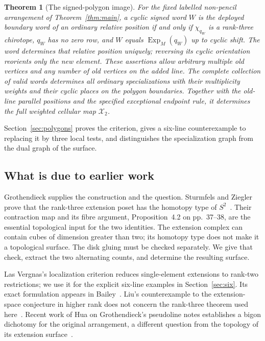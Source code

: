 \documentclass[11pt]{article}
\newtheorem{theorem}{Theorem}[section]
\theoremstyle{definition}\newtheorem{definition}[theorem]{Definition}
\begin{document}
\begin{theorem}[The signed-polygon image]\label{thm:polygon-image}
For the fixed labelled non-pencil arrangement of
Theorem~\ref{thm:main}, a cyclic signed word $W$ is the deployed
boundary word of an ordinary relative position if and only if
$\chi_{q_W}$ is a rank-three chirotope, $q_W$ has no zero row,
and $W$ equals $\operatorname{Exp}_M(q_W)$ up to cyclic shift.
The word determines that relative position uniquely; reversing its
cyclic orientation reorients only the new element. These assertions
allow arbitrary multiple old vertices and any number of old vertices
on the added line.
The complete collection of valid words determines all ordinary
specializations with their multiplicity weights and their cyclic
places on the polygon boundaries. Together with the old-line
parallel positions and the specified exceptional endpoint rule, it
determines the full weighted cellular map $\mathcal X_2$.
\end{theorem}
Section~\ref{sec:polygons} proves the criterion, gives a six-line
counterexample to replacing it by three local tests, and distinguishes
the specialization graph from the dual graph of the surface.

\subsection*{What is due to earlier work}
Grothendieck supplies the construction and the question. Sturmfels and
Ziegler prove that the rank-three extension poset has the homotopy type
of $S^2$~\cite[Theorem~1.2, p.~25; Corollary~4.5, p.~40]{SZ1993}.
Their contraction map and its fibre argument, Proposition~4.2 on
pp.~37--38, are the essential topological input for the two identities.
The extension complex can contain cubes of dimension greater than two;
its homotopy type does not make it a topological surface.
The disk gluing must be checked separately. We give that check, extract
the two alternating counts, and determine the resulting surface.

Las Vergnas's localization criterion reduces single-element extensions
to rank-two restrictions; we use it for the explicit six-line examples
in Section~\ref{sec:six}. Its exact formulation appears in
Bailey~\cite[Theorem~4.1, pp.~33--34]{Bailey1997}.
Liu's counterexample to the extension-space conjecture in higher rank
does not concern the rank-three theorem used here~\cite{Liu}.
Recent work of Hua on Grothendieck's pseudoline notes establishes a
bigon dichotomy for the original arrangement, a different question
from the topology of its extension surface~\cite{Hua}.
\end{document}
